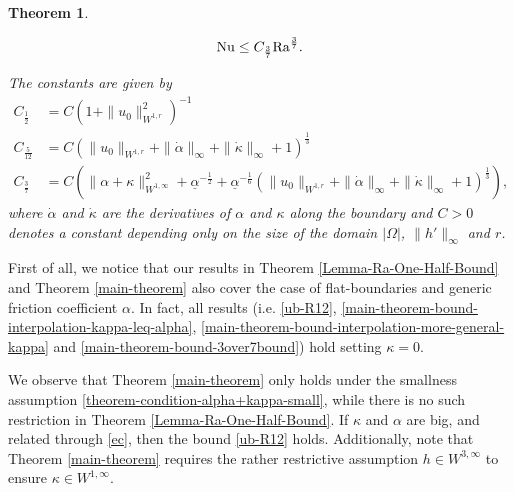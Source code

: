 \documentclass{article}
\newtheorem{theorem}{Theorem}[section]
\theoremstyle{definition}
\theoremstyle{definition}
\newcommand{\Ra}{{\rm{Ra}}}
\newcommand{\Nu}{{\rm{Nu}}}
\begin{document}
\begin{theorem}
\begin{enumerate}
\begin{align}
            \Nu \leq C_\frac{3}{7} \Ra^\frac{3}{7}.
        \end{align}
\end{enumerate}
The constants are given by 
\begin{align*}
    C_\frac{1}{2} &= C(1+\|u_0\|_{W^{1,r}}^2)^{-1}
    \\
    C_\frac{5}{12} &= C \left(\|u_0\|_{W^{1,r}}+\|\dot\alpha\|_\infty+\|\dot\kappa\|_\infty+1\right)^\frac{1}{3}
    \\
    C_\frac{3}{7} &= C \left(\|\alpha+\kappa\|_{W^{1,\infty}}^2 + \underline{\alpha}^{-\frac{1}{2}} + \underline{\alpha}^{-\frac{1}{6}}(\|u_0\|_{W^{1,r}}+\|\dot\alpha\|_\infty+\|\dot\kappa\|_\infty+1)^\frac{1}{3}\right),
\end{align*}
where $\dot \alpha$ and $\dot \kappa$ are the derivatives of $\alpha$ and $\kappa$ along the boundary and $C>0$ denotes a constant depending only on the size of the domain $|\Omega|$, $\|h'\|_{\infty}$ and $r$.
\end{theorem}

First of all, we notice that our results in Theorem \ref{Lemma-Ra-One-Half-Bound} and Theorem \ref{main-theorem} also cover the case of flat-boundaries and generic friction coefficient $\alpha$. In fact, all results (i.e. \eqref{ub-R12}, \eqref{main-theorem-bound-interpolation-kappa-leq-alpha}, \eqref{main-theorem-bound-interpolation-more-general-kappa} and \eqref{main-theorem-bound-3over7bound}) hold setting $\kappa=0$.

We observe that Theorem \ref{main-theorem} only holds under the smallness assumption \eqref{theorem-condition-alpha+kappa-small}, while there is no such restriction in Theorem \ref{Lemma-Ra-One-Half-Bound}. If $\kappa$ and $\alpha$ are big, and related through \eqref{ec}, then the bound \eqref{ub-R12} holds. Additionally, note that Theorem \ref{main-theorem} requires the rather restrictive assumption $h\in W^{3,\infty}$ to ensure $\kappa\in W^{1,\infty}$.
\end{document}
